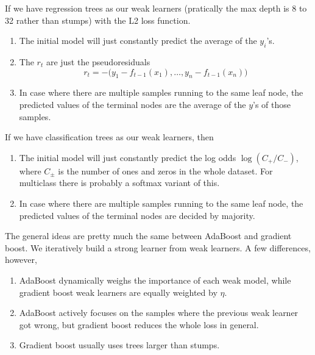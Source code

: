\documentclass{article}
\begin{document}
        \begin{example}
          If we have regression trees as our weak learners (pratically the max depth is 8 to 32 rather than stumps) with the L2 loss function.  
          \begin{enumerate}
            \item The initial model will just constantly predict the average of the $y_i$'s. 
            \item The $r_t$ are just the pseudoresiduals
              \begin{equation}
                r_t = -\big( y_1 - f_{t-1} (x_1), \ldots, y_n - f_{t-1} (x_n) \big)
              \end{equation}
            \item In case where there are multiple samples running to the same leaf node, the predicted values of the terminal nodes are the average of the $y$'s of those samples. 
          \end{enumerate}
        \end{example}

        \begin{example} 
          If we have classification trees as our weak learners, then 
          \begin{enumerate}
            \item The initial model will just constantly predict the log odds $\log(C_{+} / C_{-})$, where $C_{\pm}$ is the number of ones and zeros in the whole dataset. For multiclass there is probably a softmax variant of this. 
            \item In case where there are multiple samples running to the same leaf node, the predicted values of the terminal nodes are decided by majority. 
          \end{enumerate}
        \end{example}

        The general ideas are pretty much the same between AdaBoost and gradient boost. We iteratively build a strong learner from weak learners. A few differences, however, 
        \begin{enumerate}
          \item AdaBoost dynamically weighs the importance of each weak model, while gradient boost weak learners are equally weighted by $\eta$. 
          \item AdaBoost actively focuses on the samples where the previous weak learner got wrong, but gradient boost reduces the whole loss in general. 
          \item Gradient boost usually uses trees larger than stumps. 
        \end{enumerate}
\end{document}
